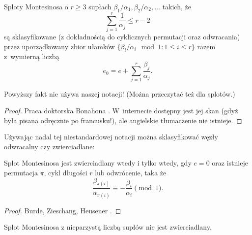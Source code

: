 \begin{proposition}
    Sploty Montesinosa o $r \ge 3$ supłach $\beta_1/\alpha_1, \beta_2/\alpha_2, \ldots$ takich, że
    \begin{equation}
        \sum_{j=1}^r \frac{1}{\alpha_j} \le r - 2
    \end{equation}
    są sklasyfikowane (z dokładnością do cyklicznych permutacji oraz odwracania) przez uporządkowany zbior ułamków $\{\beta_i/\alpha_i \mod 1 : 1 \le i \le r\}$ razem z~wymierną liczbą
    \begin{equation}
        e_0 = e + \sum_{j=1}^r \frac{\beta_j}{\alpha_j}.
    \end{equation}
\end{proposition}

Powyższy fakt nie używa naszej notacji!
(Można przeczytać też \cite[s. 28]{kawauchi1996} dla splotów.)

\begin{proof}
%
    Praca doktorska Bonahona \cite{bonahon1979}.
    W~internecie dostępny jest jej skan (gdyż była pisana odręcznie po francusku!), ale angielskie tłumaczenie nie istnieje.
\end{proof}

Używając nadal tej niestandardowej notacji można sklasyfikować węzły odwracalny czy zwierciadlane:

\begin{proposition}
%
    Splot Montesinosa jest zwierciadlany wtedy i tylko wtedy, gdy $e = 0$ oraz istnieje permutacja $\pi$, cykl długości $r$ lub odwrócenie, taka że
    \begin{equation}
        \frac{\beta_{\pi(i)}}{\alpha_{\pi(i)}} \equiv -\frac{\beta_i}{\alpha_i} \pmod 1.
    \end{equation}
\end{proposition}

\begin{proof}
    Burde, Zieschang, Heusener \cite[s. 230]{burde2014}.
\end{proof}

\begin{corollary}
    Splot Montesinosa z nieparzystą liczbą supłów nie jest zwierciadlany.
\end{corollary}

